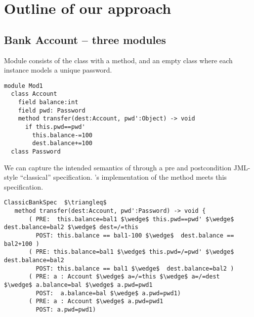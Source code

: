 

\section{Outline of our approach}
\label{s:outline}


 \subsection{Bank Account -- three modules}
\label{s:bank}
  
Module  consists of the  class with a
 method, and an empty 
 class where each instance models a unique password.
%
%
%
%
% 
\begin{lstlisting}[language=Chainmail, frame=lines]
module Mod1
  class Account
    field balance:int 
    field pwd: Password
    method transfer(dest:Account, pwd':Object) -> void
      if this.pwd==pwd'
        this.balance-=100
        dest.balance+=100
  class Password
\end{lstlisting}
%
\noindent 
We can capture the intended
semantics of %
through  a pre and postcondition 
JML-style \cite{Leavens-etal07}  ``classical''
specification.
's implementation of the  method meets
this specification.



\begin{lstlisting}[mathescape=true, frame=lines, language=Chainmail]
ClassicBankSpec  $\triangleq$
   method transfer(dest:Account, pwd':Password) -> void {
       ( PRE:  this.balance=bal1 $\wedge$ this.pwd==pwd' $\wedge$ dest.balance=bal2 $\wedge$ dest=/=this 
         POST: this.balance == bal1-100 $\wedge$  dest.balance == bal2+100 )
       ( PRE: this.balance=bal1 $\wedge$ this.pwd=/=pwd' $\wedge$ dest.balance=bal2
         POST: this.balance == bal1 $\wedge$  dest.balance=bal2 )
       ( PRE: a : Account $\wedge$ a=/=this $\wedge$ a=/=dest  $\wedge$ a.balance=bal $\wedge$ a.pwd=pwd1
         POST:  a.balance=bal $\wedge$ a.pwd=pwd1)
       ( PRE: a : Account $\wedge$ a.pwd=pwd1  
         POST: a.pwd=pwd1)       
\end{lstlisting}
 
